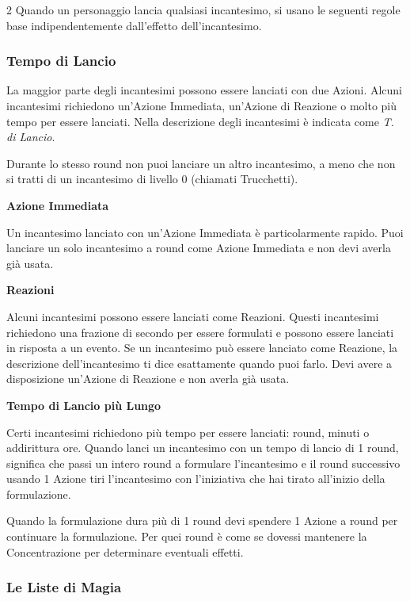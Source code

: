 \begin{multicols}{2}
Quando un personaggio lancia qualsiasi incantesimo, si usano le seguenti regole base indipendentemente dall'effetto dell'incantesimo.

\subsubsection{Tempo di Lancio}\label{magietempodilancio}\hypertarget{magietempodilancio}{}

La maggior parte degli incantesimi possono essere lanciati con due Azioni. Alcuni incantesimi richiedono un'Azione Immediata, un'Azione di Reazione o molto più tempo per essere lanciati. Nella descrizione degli incantesimi è indicata come \emph{T. di Lancio}.

Durante lo stesso round non puoi lanciare un altro incantesimo, a meno che non si tratti di un incantesimo di livello 0 (chiamati Trucchetti).

\smallskip \textbf{Azione Immediata} \smallskip

Un incantesimo lanciato con un'Azione Immediata è particolarmente rapido. Puoi lanciare un solo incantesimo a round come Azione Immediata e non devi averla già usata.

\smallskip \textbf{Reazioni} \smallskip

Alcuni incantesimi possono essere lanciati come Reazioni. Questi incantesimi richiedono una frazione di secondo per essere formulati e possono essere lanciati in risposta a un evento. Se un incantesimo può essere lanciato come Reazione, la descrizione dell'incantesimo ti dice esattamente quando puoi farlo. Devi avere a disposizione un'Azione di Reazione e non averla già usata.

\smallskip \textbf{Tempo di Lancio più Lungo} \smallskip

Certi incantesimi richiedono più tempo per essere lanciati: round, minuti o addirittura ore.
Quando lanci un incantesimo con un tempo di lancio di 1 round, significa che passi un intero round a formulare l'incantesimo e il round successivo usando 1 Azione tiri l'incantesimo con l'iniziativa che hai tirato all'inizio della formulazione.

Quando la formulazione dura più di 1 round devi spendere 1 Azione a round per continuare la formulazione. Per quei round è come se dovessi mantenere la Concentrazione per determinare eventuali effetti.

\subsubsection{Le Liste di Magia}\hypertarget{lescuoledimagia}{} \label{magielistadimagia}


\end{multicols}
